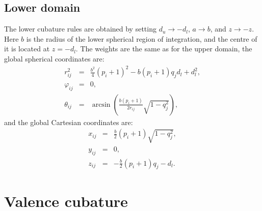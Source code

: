 \documentclass[11pt]{amsart}
\begin{document}
\subsection{Lower domain}

The lower cubature rules are obtained by setting $d_u\rightarrow -d_l$,
$a\rightarrow b$, and $z\rightarrow-z$. Here $b$ is the radius of the lower
spherical region of integration, and the centre of it is located at $z=-d_l$.
The weights are the same as for the upper domain, the global spherical coordinates
are:
%
\begin{subequations}
\begin{eqnarray}
	r^2_{ij} & = & \frac{b^2}{4}(p_i+1)^2-b(p_i+1)q_jd_l+d_l^2,\\
	\varphi_{ij} & = & 0,\\
	\theta_{ij} & = & \arcsin\left(\frac{b(p_i+1)}{2r_{ij}}\sqrt{1-q_j^2}\right),
\end{eqnarray}
\end{subequations}
%
and the global Cartesian coordinates are:
%
\begin{subequations}
\begin{eqnarray}
	x_{ij} & = & \frac{b}{2}(p_i+1)\sqrt{1-q_j^2},\\
	y_{ij} & = & 0,\\
	z_{ij} & = & -\frac{b}{2}(p_i+1)q_j-d_l.
\end{eqnarray}
%
\end{subequations}

\section{Valence cubature}
\end{document}
